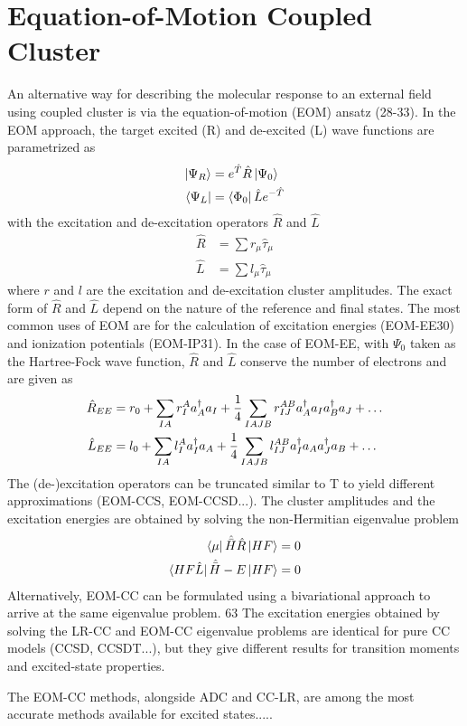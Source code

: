 
\section{Equation-of-Motion Coupled Cluster}

An alternative way for describing the molecular response to an external field using coupled cluster is via the equation-of-motion (EOM) ansatz (28-33). In the EOM approach, the target excited (R) and de-excited (L) wave functions are parametrized as 
\begin{align}
\ket{\smash{\Psi_R}} &= e^{\hat{T}} \hat{R} \ket{\smash{\Psi_0}} \\
\bra{\smash{\Psi_L}} &= \bra{\smash{\Phi_0}} \hat{L} e^{-\hat{T}} 
\end{align}
\noindent with the excitation and de-excitation operators $\hat{R}$ and $\hat{L}$ 
\begin{align}
\hat{R} &= \sum r_{\mu} \hat{\tau}_{\mu} \\
\hat{L} &= \sum l_{\mu} \hat{\tau}_{\mu}
\end{align}
\noindent where $r$ and $l$ are the excitation and de-excitation cluster amplitudes. The exact form of $\hat{R}$ and $\hat{L}$ depend on the nature of the reference and final states. The most common uses of EOM are for the calculation of excitation energies (EOM-EE30) and ionization potentials (EOM-IP31). In the case of EOM-EE, with $\Psi_0$ taken as the Hartree-Fock wave function, $\hat{R}$ and $\hat{L}$ conserve the number of electrons and are given as
\begin{align}
\hat{R}_{EE} &= r_0 + \sum_{IA} r_I^A a_A^{\dagger} a_I + \frac{1}{4} \sum_{IAJB} r_{IJ}^{AB} a_A^{\dagger} a_I a_B^{\dagger} a_J + \ldots \\
\hat{L}_{EE} &= l_0 + \sum_{IA} l_I^A a_I^{\dagger} a_A + \frac{1}{4} \sum_{IAJB} l_{IJ}^{AB} a_I^{\dagger} a_A a_J^{\dagger} a_B + \ldots
\end{align}
The (de-)excitation operators can be truncated similar to T 
to yield different approximations (EOM-CCS, EOM-CCSD...). The cluster amplitudes and the excitation energies are obtained 
by solving the non-Hermitian eigenvalue problem 
\begin{align}
\bra{\smash{\mu}} \hat{\bar{H}} \hat{R} \ket{\smash{HF}} &= 0 \\
\bra{\smash{HF \hat{L}}} \hat{\bar{H}} - E \ket{\smash{HF}} &= 0
\end{align}
Alternatively, EOM-CC can be formulated using a bivariational approach to arrive at the same eigenvalue 
problem. 63 The excitation energies obtained by solving the LR-CC and EOM-CC eigenvalue problems are identical for pure CC models (CCSD, CCSDT...), but they give different results for transition moments and excited-state properties.

The EOM-CC methods, alongside ADC and CC-LR, are among the most accurate methods available for excited states..... 




